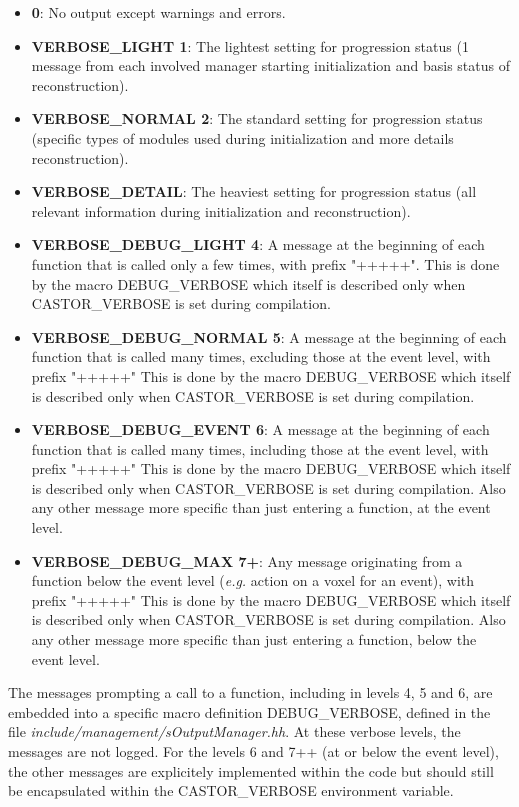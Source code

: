 \documentclass[a4paper, 11pt]{article}
\begin{document}
\begin{itemize}
  \item \textbf{0}:  No output except warnings and errors.
  \item \textbf{VERBOSE\_LIGHT 1}:  The lightest setting for progression status (1 message from each involved manager starting initialization and basis status of reconstruction).
  \item \textbf{VERBOSE\_NORMAL 2}:  The standard setting for progression status (specific types of modules used during initialization and more details reconstruction).
  \item \textbf{VERBOSE\_DETAIL}:  The heaviest setting for progression status (all relevant information during initialization and reconstruction).
  \item \textbf{VERBOSE\_DEBUG\_LIGHT 4}:  A message at the beginning of each function that is called only a few times, with prefix "+++++".
                                         This is done by the macro DEBUG\_VERBOSE which itself is described only when CASTOR\_VERBOSE is set during compilation.
  \item \textbf{VERBOSE\_DEBUG\_NORMAL 5}:  A message at the beginning of each function that is called many times, excluding those at the event level, with prefix "+++++"
                                          This is done by the macro DEBUG\_VERBOSE which itself is described only when CASTOR\_VERBOSE is set during compilation.
  \item \textbf{VERBOSE\_DEBUG\_EVENT 6}:  A message at the beginning of each function that is called many times, including those at the event level, with prefix "+++++"
                                         This is done by the macro DEBUG\_VERBOSE which itself is described only when CASTOR\_VERBOSE is set during compilation.
                                         Also any other message more specific than just entering a function, at the event level.
  \item \textbf{VERBOSE\_DEBUG\_MAX 7+}: Any message originating from a function below the event level (\textit{e.g.} action on a voxel for an event), with prefix "+++++"
                                       This is done by the macro DEBUG\_VERBOSE which itself is described only when CASTOR\_VERBOSE is set during compilation.
                                       Also any other message more specific than just entering a function, below the event level.
\end{itemize}

The messages prompting a call to a function, including in levels 4, 5 and 6, are embedded into a specific macro definition DEBUG\_VERBOSE, defined in the file
\textit{include/management/sOutputManager.hh}. At these verbose levels, the messages are not logged. For the levels 6 and 7++ (at or below the event level),
the other messages are explicitely implemented within the code but should still be encapsulated within the CASTOR\_VERBOSE environment variable.
\end{document}
